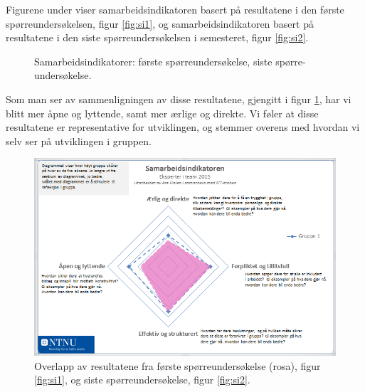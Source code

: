 Figurene under viser samarbeidsindikatoren basert på resultatene i den første spørreundersøkelsen, figur \ref{fig:si1},
og samarbeidsindikatoren basert på resultatene i den siste spørreundersøkelsen i semesteret, figur \ref{fig:si2}.
\begin{figure}[H] \centering
{}
\caption{Samarbeidsindikatorer: \protect{\ref{fig:si1}} første spørreundersøkelse, \protect{\ref{fig:si2}} siste spørre{-}undersøkelse.}
\end{figure}
Som man ser av sammenligningen av disse resultatene, gjengitt i figur \ref{fig:si3}, 
har vi blitt mer åpne og lyttende, samt mer ærlige og direkte.
Vi føler at disse resultatene er representative for utviklingen, 
og stemmer overens med hvordan vi selv ser på utviklingen i gruppen. 
	\newline
	\begin{figure}[H]
		\centering
		\includegraphics[width=1.00\textwidth]{images/samarbeidsindikator_sammenligning.png}
		\caption{Overlapp av resultatene fra første spørreundersøkelse (rosa), figur \ref{fig:si1}, og siste spørreundersøkelse, figur \ref{fig:si2}.}
		\label{fig:si3}
	\end{figure}

